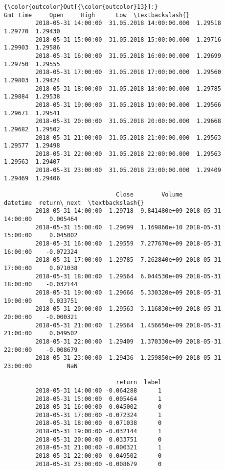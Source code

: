 \documentclass[11pt]{article}
\begin{document}
\begin{Verbatim}[commandchars=\\\{\}]
{\color{outcolor}Out[{\color{outcolor}13}]:}                                     Gmt time     Open     High      Low  \textbackslash{}
         2018-05-31 14:00:00  31.05.2018 14:00:00.000  1.29518  1.29770  1.29430   
         2018-05-31 15:00:00  31.05.2018 15:00:00.000  1.29716  1.29903  1.29586   
         2018-05-31 16:00:00  31.05.2018 16:00:00.000  1.29699  1.29750  1.29555   
         2018-05-31 17:00:00  31.05.2018 17:00:00.000  1.29560  1.29803  1.29424   
         2018-05-31 18:00:00  31.05.2018 18:00:00.000  1.29785  1.29884  1.29538   
         2018-05-31 19:00:00  31.05.2018 19:00:00.000  1.29566  1.29671  1.29541   
         2018-05-31 20:00:00  31.05.2018 20:00:00.000  1.29668  1.29682  1.29502   
         2018-05-31 21:00:00  31.05.2018 21:00:00.000  1.29563  1.29577  1.29498   
         2018-05-31 22:00:00  31.05.2018 22:00:00.000  1.29563  1.29563  1.29407   
         2018-05-31 23:00:00  31.05.2018 23:00:00.000  1.29409  1.29469  1.29406   
         
                                Close        Volume            datetime  return\_next  \textbackslash{}
         2018-05-31 14:00:00  1.29718  9.841480e+09 2018-05-31 14:00:00     0.005464   
         2018-05-31 15:00:00  1.29699  1.169860e+10 2018-05-31 15:00:00     0.045002   
         2018-05-31 16:00:00  1.29559  7.277670e+09 2018-05-31 16:00:00    -0.072324   
         2018-05-31 17:00:00  1.29785  7.262840e+09 2018-05-31 17:00:00     0.071038   
         2018-05-31 18:00:00  1.29564  6.044530e+09 2018-05-31 18:00:00    -0.032144   
         2018-05-31 19:00:00  1.29666  5.330320e+09 2018-05-31 19:00:00     0.033751   
         2018-05-31 20:00:00  1.29563  3.116830e+09 2018-05-31 20:00:00    -0.000321   
         2018-05-31 21:00:00  1.29564  1.456650e+09 2018-05-31 21:00:00     0.049502   
         2018-05-31 22:00:00  1.29409  1.370330e+09 2018-05-31 22:00:00    -0.008679   
         2018-05-31 23:00:00  1.29436  1.259850e+09 2018-05-31 23:00:00          NaN   
         
                                return  label  
         2018-05-31 14:00:00 -0.064288      1  
         2018-05-31 15:00:00  0.005464      1  
         2018-05-31 16:00:00  0.045002      0  
         2018-05-31 17:00:00 -0.072324      1  
         2018-05-31 18:00:00  0.071038      0  
         2018-05-31 19:00:00 -0.032144      1  
         2018-05-31 20:00:00  0.033751      0  
         2018-05-31 21:00:00 -0.000321      1  
         2018-05-31 22:00:00  0.049502      0  
         2018-05-31 23:00:00 -0.008679      0  
\end{Verbatim}
            
\end{document}
